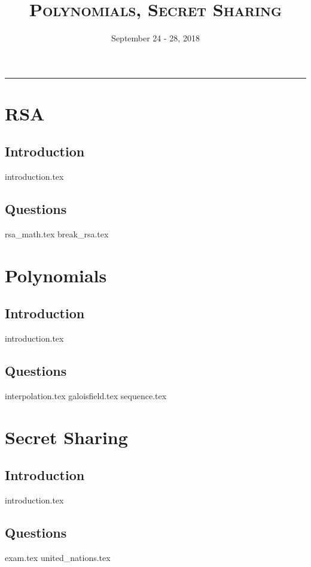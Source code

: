 \documentclass{exam}
\title{\Large \textsc{Polynomials, Secret Sharing}}
\date{September 24 - 28, 2018}
\begin{document}
\maketitle
\rule{\textwidth}{0.15em}
\fontsize{12}{15}\selectfont
\thispagestyle{empty}

\section{RSA}
\subsection{Introduction}
{introduction.tex}
\newpage
\subsection{Questions}
\begin{questions}
{rsa_math.tex}
{break_rsa.tex}
\end{questions}
\section{Polynomials}
\subsection{Introduction}
{introduction.tex}
\subsection{Questions}
\begin{questions}
{interpolation.tex}
{galoisfield.tex}
{sequence.tex}
\end{questions}
\newpage
\section{Secret Sharing}
\subsection{Introduction}
	{introduction.tex}
\subsection{Questions}
\begin{questions}
	{exam.tex}
	{united_nations.tex}
\end{questions}
\end{document}
